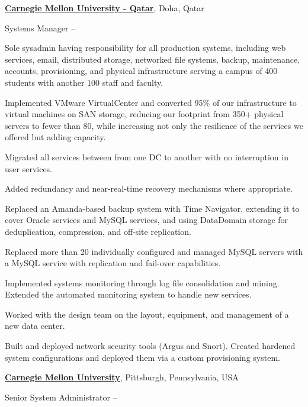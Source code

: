 \documentclass[letterpaper,10pt,oneside]{article}
\begin{document}
\begin{body}
\begin{detail}
\end{detail}
\EntryGap


\href{http://qatar.cmu.edu/}
{\textbf{Carnegie Mellon University - Qatar}},
Doha, Qatar
\par
Systems Manager
\hfill
{} -- 

\begin{detail}
\BulletItem
Sole sysadmin having responsibility for all production systems, including
web services, email, distributed storage, networked file systems, backup,
maintenance, accounts, provisioning, and physical infrastructure serving a
campus of 400 students with another 100 staff and faculty.

\BulletItem
Implemented VMware VirtualCenter and converted 95\% of our infrastructure
to virtual machines on SAN storage, reducing our footprint from 350+
physical servers to fewer than 80, while increasing not only the resilience
of the services we offered but adding capacity.

\BulletItem
Migrated all services between from one DC to another with no interruption
in user services.

\BulletItem
Added redundancy and near-real-time recovery mechanisms where appropriate.

\BulletItem
Replaced an Amanda-based backup system with Time Navigator, extending it to
cover Oracle services and MySQL services, and using DataDomain storage for
deduplication, compression, and off-site replication.

\BulletItem
Replaced more than 20 individually configured and managed MySQL servers
with a MySQL service with replication and fail-over capabilities.

\BulletItem
Implemented systems monitoring through log file consolidation and
mining. Extended the automated monitoring system to handle new services.

\BulletItem
Worked with the design team on the layout, equipment, and management of a
new data center.

\BulletItem
Built and deployed network security tools (Argus and Snort). Created
hardened system configurations and deployed them via a custom provisioning
system.

\end{detail}
\EntryGap

\href{http://www.cmu.edu/}
{\textbf{Carnegie Mellon University}},
Pittsburgh, Pennsylvania, USA
\par
Senior System Administrator
\hfill
{} -- 


\end{body}
\end{document}
